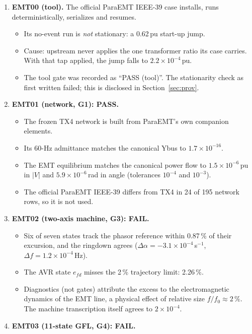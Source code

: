 \documentclass[10pt,a4paper]{article}
\newcommand{\sinv}{\,s$^{-1}$}
\begin{document}
\begin{enumerate}
\item \textbf{EMT00 (tool).} The official ParaEMT IEEE-39 case installs, runs
  deterministically, serializes and resumes.
  \begin{itemize}
  \item Its no-event run is \emph{not} stationary: a 0.62\,pu start-up jump.
  \item Cause: upstream never applies the one transformer ratio its case
    carries. With that tap applied, the jump falls to $2.2\times10^{-4}$\,pu.
  \item The tool gate was recorded as ``PASS (tool)''. The stationarity check
    as first written failed; this is disclosed in Section~\ref{sec:prov}.
  \end{itemize}
\item \textbf{EMT01 (network, G1): PASS.}
  \begin{itemize}
  \item The frozen TX4 network is built from ParaEMT's own companion elements.
  \item Its 60-Hz admittance matches the canonical Ybus to
    $1.7\times10^{-16}$.
  \item The EMT equilibrium matches the canonical power flow to
    $1.5\times10^{-6}$\,pu in $|V|$ and $5.9\times10^{-6}$\,rad in angle
    (tolerances $10^{-4}$ and $10^{-3}$).
  \item The official ParaEMT IEEE-39 differs from TX4 in 24 of 195 network
    rows, so it is not used.
  \end{itemize}
\item \textbf{EMT02 (two-axis machine, G3): FAIL.}
  \begin{itemize}
  \item Six of seven states track the phasor reference within 0.87\,\% of
    their excursion, and the ringdown agrees
    ($\Delta\alpha=-3.1\times10^{-4}$\sinv, $\Delta f=1.2\times10^{-4}$\,Hz).
  \item The AVR state $e_{fd}$ misses the 2\,\% trajectory limit: 2.26\,\%.
  \item Diagnostics (not gates) attribute the excess to the electromagnetic
    dynamics of the EMT line, a physical effect of relative size
    $f/f_0\approx2\,\%$. The machine transcription itself agrees to
    $2\times10^{-4}$.
  \end{itemize}
\item \textbf{EMT03 (11-state GFL, G4): FAIL.}
  \begin{itemize}

\end{itemize}
\end{enumerate}
\end{document}
